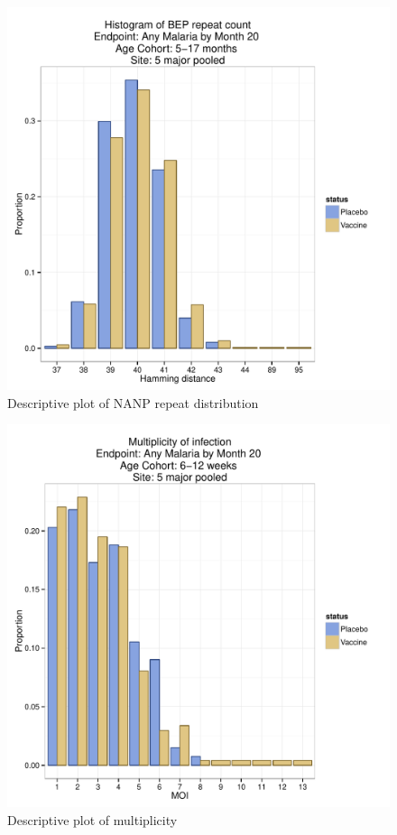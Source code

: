 \documentclass[]{article}
\begin{document}
\begin{figure}[htbp]
\centering
\includegraphics{figures/bep-hist-infant-c-1.pdf}
\caption{Descriptive plot of NANP repeat distribution}
\end{figure}

\begin{figure}[htbp]
\centering
\includegraphics{figures/moi-newborn-x-1.pdf}
\caption{Descriptive plot of multiplicity}
\end{figure}
\end{document}
